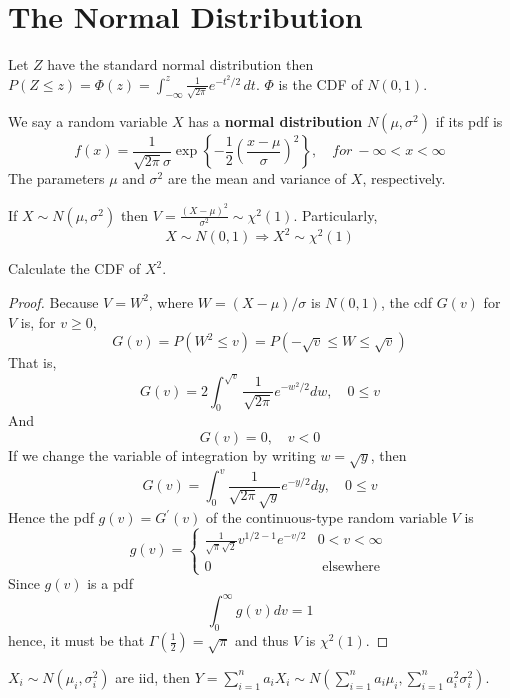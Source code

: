 \section{The Normal Distribution}

Let $Z$ have the standard normal distribution then $P(Z\leq z)=\Phi(z)=\int_{-\infty}^{z} \frac{1}{\sqrt{ 2\pi }}e^{ -t^{2}/2 } \, dt$. $\Phi$ is the CDF of $N(0,1)$.

\begin{definition}
We say a random variable $X$ has a \textbf{normal distribution} $N(\mu,\sigma^{2})$ if its pdf is
\[
f(x)=\frac{1}{\sqrt{ 2\pi }\sigma} \exp \left\{  -\frac{1}{2}\left( \frac{x-\mu}{\sigma} \right)^{2}  \right\},\quad for \ -\infty<x<\infty
\]
The parameters $\mu$ and $\sigma^{2}$ are the mean and variance of $X$, respectively.
\end{definition}
\begin{theorem}
If $X\sim N(\mu,\sigma^{2})$ then $V=\frac{(X-\mu)^{2}}{\sigma^{2}}\sim \chi^{2}(1)$. Particularly,
\begin{equation}
X\sim N(0,1)\Rightarrow X^{2}\sim \chi^{2}(1)
\label{f74ad8}
\end{equation}
\end{theorem}

\begin{note}
Calculate the CDF of $X^{2}$.
\end{note}
\begin{proof} Because $V=W^2$, where $W=(X-\mu) / \sigma$ is $N(0,1)$, the cdf $G(v)$ for $V$ is, for $v \geq 0$,
\[
G(v)=P\left(W^2 \leq v\right)=P(-\sqrt{v} \leq W \leq \sqrt{v})
\]
That is,
\[
G(v)=2 \int_0^{\sqrt{v}} \frac{1}{\sqrt{2 \pi}} e^{-w^2 / 2} d w, \quad 0 \leq v
\]
And
\[
G(v)=0, \quad v<0
\]
If we change the variable of integration by writing $w=\sqrt{y}$, then
\[
G(v)=\int_0^v \frac{1}{\sqrt{2 \pi} \sqrt{y}} e^{-y / 2} d y, \quad 0 \leq v
\]
Hence the pdf $g(v)=G^{\prime}(v)$ of the continuous-type random variable $V$ is
\[
g(v)= \begin{cases}\frac{1}{\sqrt{\pi} \sqrt{2}} v^{1 / 2-1} e^{-v / 2} & 0<v<\infty \\ 0 & \text { elsewhere }\end{cases}
\]
Since $g(v)$ is a pdf
\[
\int_0^{\infty} g(v) d v=1
\]
hence, it must be that $\Gamma\left(\frac{1}{2}\right)=\sqrt{\pi}$ and thus $V$ is $\chi^2(1)$.
\end{proof}

\begin{theorem}
$X_i\sim N(\mu _i,\sigma _i^{2})$ are iid, then $Y=\sum_{i=1}^{n}a_iX_i\sim N\left( \sum_{i=1}^{n}a_i \mu _i,\sum_{i=1}^{n}a_i^{2}\sigma _i^{2} \right)$.\label{1c233a}
\end{theorem}

